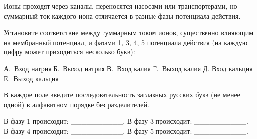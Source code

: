 
Ионы проходят через каналы, переносятся насосами или транспортерами, но суммарный ток каждого иона отличается в разные фазы потенциала действия.

Установите соответствие между суммарным током ионов, существенно влияющим на мембранный потенциал, и фазами 1, 3, 4, 5 потенциала действия (на каждую цифру может приходиться несколько букв):


А. Вход натрия
Б. Выход натрия
В. Вход калия
Г. Выход калия
Д. Вход кальция
Е. Выход кальция

В каждое поле введите последовательность заглавных русских букв (не менее одной) в алфавитном порядке без разделителей.

В фазу 1 происходит: __________. В фазу 3 происходит: __________. В фазу 4 происходит: __________. В фазу 5 происходит: __________.